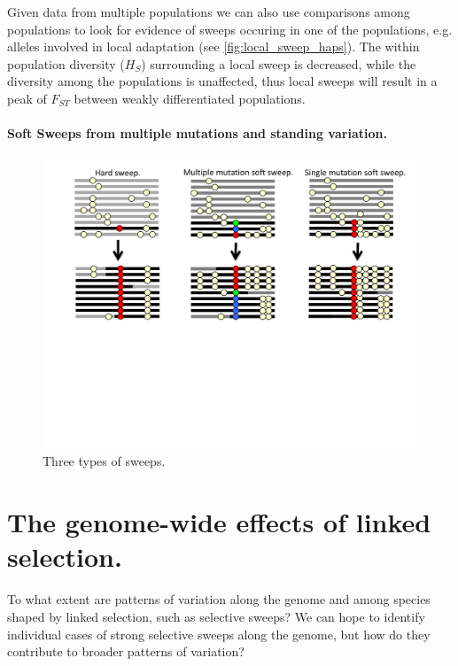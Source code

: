 Given data from multiple populations we can also use comparisons among
populations to look for evidence of sweeps occuring in one of the
populations, e.g. alleles involved in local adaptation (see \ref{fig:local_sweep_haps}). The within population diversity ($H_S$)
surrounding a local sweep is decreased, while the diversity among the
populations is unaffected, thus local sweeps will result in a peak of
$F_{ST}$ between weakly differentiated populations. 


\paragraph{Soft Sweeps from multiple mutations and standing variation.}



\begin{figure}
\begin{center}
\includegraphics[width=\textwidth]{figures/Hitchhiking/Soft_sweeps.pdf}
\end{center}
\caption{Three types of sweeps. } \label{fig:soft_sweep_haps}
\end{figure}



\section{The genome-wide effects of linked selection.}

To what extent are patterns of variation along the genome and
  among species shaped by linked selection, such as selective sweeps? 
We can hope to identify individual cases of strong selective sweeps
along the genome, but how do they contribute to broader patterns of
variation?

